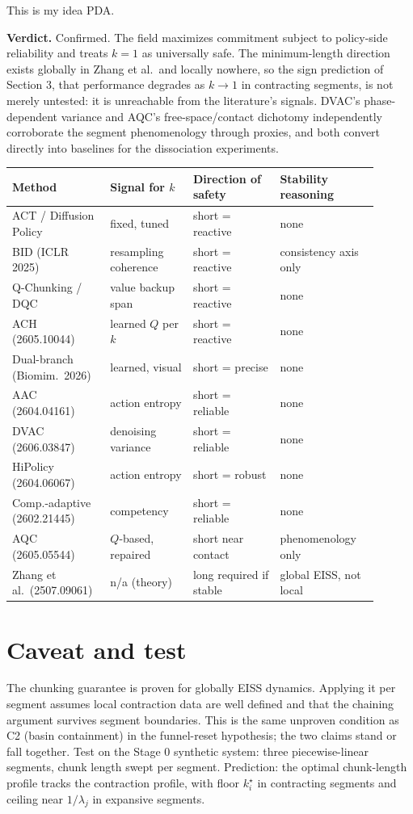 This is my idea PDA. \documentclass[11pt]{article}
\begin{document}
\textbf{Verdict.} Confirmed. The field maximizes commitment subject to policy-side reliability and treats $k=1$ as universally safe. The minimum-length direction exists globally in Zhang et al.\ and locally nowhere, so the sign prediction of Section 3, that performance degrades as $k \to 1$ in contracting segments, is not merely untested: it is unreachable from the literature's signals. DVAC's phase-dependent variance and AQC's free-space/contact dichotomy independently corroborate the segment phenomenology through proxies, and both convert directly into baselines for the dissociation experiments.

\medskip
\noindent\begin{footnotesize}
\begin{tabular}{@{}p{0.22\linewidth}p{0.21\linewidth}p{0.22\linewidth}p{0.25\linewidth}@{}}
\hline
Method & Signal for $k$ & Direction of safety & Stability reasoning \\
\hline
ACT / Diffusion Policy & fixed, tuned & short = reactive & none \\
BID (ICLR 2025) & resampling coherence & short = reactive & consistency axis only \\
Q-Chunking / DQC & value backup span & short = reactive & none \\
ACH (2605.10044) & learned $Q$ per $k$ & short = reactive & none \\
Dual-branch (Biomim.\ 2026) & learned, visual & short = precise & none \\
AAC (2604.04161) & action entropy & short = reliable & none \\
DVAC (2606.03847) & denoising variance & short = reliable & none \\
HiPolicy (2604.06067) & action entropy & short = robust & none \\
Comp.-adaptive (2602.21445) & competency & short = reliable & none \\
AQC (2605.05544) & $Q$-based, repaired & short near contact & phenomenology only \\
Zhang et al.\ (2507.09061) & n/a (theory) & long required if stable & global EISS, not local \\
\hline
\end{tabular}
\end{footnotesize}

\section*{Caveat and test}

The chunking guarantee is proven for globally EISS dynamics. Applying it per segment assumes local contraction data are well defined and that the chaining argument survives segment boundaries. This is the same unproven condition as C2 (basin containment) in the funnel-reset hypothesis; the two claims stand or fall together. Test on the Stage 0 synthetic system: three piecewise-linear segments, chunk length swept per segment. Prediction: the optimal chunk-length profile tracks the contraction profile, with floor $k^\star_i$ in contracting segments and ceiling near $1/\lambda_j$ in expansive segments.
\end{document}
